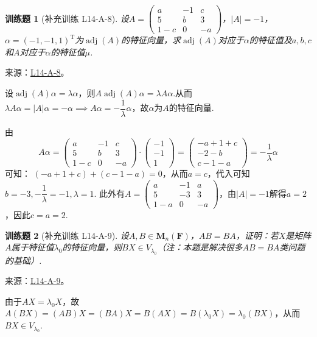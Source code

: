 \documentclass[12pt,fontset=fandol]{ctexart}
\newtheorem{exercise}{训练题}[section]
\begin{document}
\begin{exercise}[补充训练 L14-A-8]\label{prob:L14-A-8}
设$A=\begin{pmatrix}
                a & -1 & c \\ 5 & b & 3 \\ 1-c & 0 & -a
            \end{pmatrix}$，$|A|=-1$，$\alpha=(-1,-1,1)^\mathrm{T}$为$\operatorname{adj}(A)$的特征向量，求$\operatorname{adj}(A)$对应于$\alpha$的特征值及$a,b,c$和$A$对应于$\alpha$的特征值$\mu$.
\end{exercise}
\noindent 来源：\href{https://github.com/yhwu-is/Linear-Algebra-Left-Undone/blob/new/%E8%AE%B2%E4%B9%89/%E4%B8%93%E9%A2%98/14%20%E7%9B%B8%E4%BC%BC%E6%A0%87%E5%87%86%E5%BD%A2%EF%BC%9A%E5%8A%A8%E6%9C%BA%E4%B8%8E%E5%9F%BA%E7%A1%80.tex}{L14-A-8}。
\begin{solve}
设$\operatorname{adj}(A)\alpha=\lambda \alpha$，则$A\operatorname{adj}(A)\alpha=\lambda A\alpha$.从而$\lambda A\alpha=|A|\alpha=-\alpha\implies A\alpha=-\dfrac{1}{\lambda}\alpha$，故$\alpha$为$A$的特征向量.

            由
\[A\alpha=\begin{pmatrix}
                a & -1 & c \\ 5 & b & 3 \\ 1-c & 0 & -a
            \end{pmatrix}\cdot\begin{pmatrix}
                -1 \\ -1 \\ 1
            \end{pmatrix}=\begin{pmatrix}
                -a+1+c \\ -2-b \\ c-1-a
            \end{pmatrix}=-\dfrac{1}{\lambda}\alpha\]
可知：
            $(-a+1+c)+(c-1-a)=0$，从而$a=c$，代入可知$b=-3,-\dfrac{1}{\lambda}=-1,\lambda=1$.
            此外有$A=\begin{pmatrix}
                a & -1 & a \\ 5 & -3 & 3 \\ 1-a & 0 & -a
            \end{pmatrix}$，由$|A|=-1$解得$a=2$，因此$c=a=2$.
\end{solve}

\begin{exercise}[补充训练 L14-A-9]\label{prob:L14-A-9}
设$A,B\in \mathbf{M}_n(\mathbf{F})$，$AB=BA$，证明：若$X$是矩阵$A$属于特征值$\lambda_0$的特征向量，则$BX\in V_{\lambda_0}$（注：本题是解决很多$AB=BA$类问题的基础）.
\end{exercise}
\noindent 来源：\href{https://github.com/yhwu-is/Linear-Algebra-Left-Undone/blob/new/%E8%AE%B2%E4%B9%89/%E4%B8%93%E9%A2%98/14%20%E7%9B%B8%E4%BC%BC%E6%A0%87%E5%87%86%E5%BD%A2%EF%BC%9A%E5%8A%A8%E6%9C%BA%E4%B8%8E%E5%9F%BA%E7%A1%80.tex}{L14-A-9}。
\begin{solve}
由于$AX=\lambda_0 X$，故$A(BX)=(AB)X=(BA)X=B(AX)=B(\lambda_0X)=\lambda_0(BX)$，从而$BX\in V_{\lambda_0}$.
\end{solve}
\end{document}
